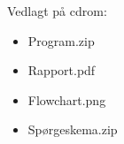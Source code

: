 \label{sec:bilcd}
Vedlagt på cdrom:
\begin{itemize}
    \item Program.zip
    \item Rapport.pdf
    \item Flowchart.png
    \item Spørgeskema.zip
\end{itemize}